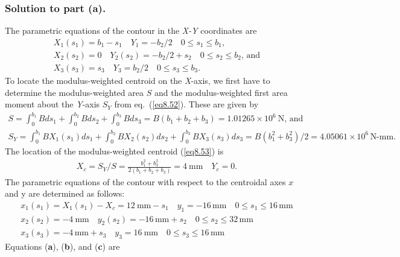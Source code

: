 \documentclass{AeroStructure-ERJohnson}
\begin{document}
\begin{example*}
\subsubsection{Solution to part (a).} The parametric equations of the contour in the \textit{X-Y}
coordinates are
\begin{gather*}
X_{1}\left(s_{1}\right)=b_{1}-s_{1} \quad Y_{1}=-b_{2}/ 2 \quad 0 \leq s_{1} \leq b_{1},\\
X_{2}\left(s_{2}\right)=0 \quad Y_{2}\left(s_{2}\right)=-b_{2}/
2+s_{2} \quad 0 \leq s_{2} \leq b_{2}\mbox{, and}\\
X_{3}\left(s_{3}\right)=s_{3} \quad Y_{3}=b_{2}/ 2 \quad 0 \leq
s_{3} \leq b_{3}.
\end{gather*}
To locate the modulus-weighted centroid on the \textit{X}-axis, we
first have to determine the modulus-weighted area $S$ and the
modulus-weighted first area moment about the \textit{Y}-axis
$S_{Y}$ from eq.~(\ref{eq8.52}). These are given by
\begin{gather*}
S=\int_{0}^{b_{1}} B d s_{1}+\int_{0}^{b_{2}} B d
s_{2}+\int_{0}^{b_{3}} B d
s_{3}=B\left(b_{1}+b_{2}+b_{3}\right)=1.01265 \times 10^{6}
\mathrm{~N}\mbox{, and }\\
S_{Y}=\int_{0}^{b_{1}} B
X_{1}\left(s_{1}\right) d s_{1}+\int_{0}^{b_{2}} B
X_{2}\left(s_{2}\right) d s_{2}+\int_{0}^{b_{3}} B
X_{3}\left(s_{3}\right) d s_{3}=B\left(b_{1}^{2}+b_{3}^{2}\right)
/ 2=4.05061 \times 10^{6}\,\textrm{N-mm}.
\end{gather*}
The location of the modulus-weighted centroid (\ref{eq8.53}) is
\begin{gather*}
X_{c}=S_{Y}/
S=\frac{b_{1}^{2}+b_{3}^{2}}{2\left(b_{1}+b_{2}+b_{3}\right)}=4
\mathrm{~mm} \quad Y_{c}=0.
\end{gather*}
The parametric equations of the contour with respect to the
centroidal axes $x$ and y are determined as follows:
\begin{gather}
x_{1}\left(s_{1}\right)=X_{1}\left(s_{1}\right)-X_{c}=12
\mathrm{~mm}-s_{1} \quad y_{1}=-16\,\mathrm{mm} \quad 0 \leq s_{1}
\leq 16\,\mathrm{mm}\tag{a}\label{ex8.5a}\\
x_{2}\left(s_{2}\right)=-4
\mathrm{~mm} \quad y_{2}\left(s_{2}\right)=-16\,\mathrm{mm}+s_{2}
\quad 0 \leq s_{2} \leq 32\,\mathrm{mm}\tag{b}\label{ex8.5b}\\
x_{3}\left(s_{3}\right)=-4\,\mathrm{mm}+s_{3} \quad y_{3}=16
\mathrm{~mm} \quad 0 \leq s_{3} \leq 16\,\mathrm{mm}\tag{c}\label{ex8.5c}
\end{gather}
Equations (\textbf{a}), (\textbf{b}), and (\textbf{c}) are

\end{example*}
\end{document}
